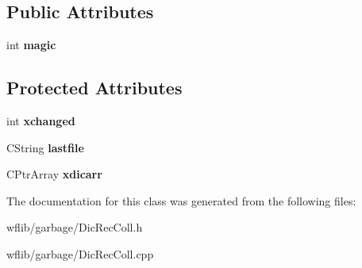 \subsection*{Public Attributes}
\begin{DoxyCompactItemize}
\item 
\hypertarget{class_c_dic_rec_coll_a12f12ef510e8da90ca4b0f6b7d59945f}{int {\bfseries magic}}\label{class_c_dic_rec_coll_a12f12ef510e8da90ca4b0f6b7d59945f}

\end{DoxyCompactItemize}
\subsection*{Protected Attributes}
\begin{DoxyCompactItemize}
\item 
\hypertarget{class_c_dic_rec_coll_a1b295ef62d9b8d3ac5f66213de0d531d}{int {\bfseries xchanged}}\label{class_c_dic_rec_coll_a1b295ef62d9b8d3ac5f66213de0d531d}

\item 
\hypertarget{class_c_dic_rec_coll_ad749c5cc58b0191a9983a9aec6474332}{C\-String {\bfseries lastfile}}\label{class_c_dic_rec_coll_ad749c5cc58b0191a9983a9aec6474332}

\item 
\hypertarget{class_c_dic_rec_coll_a39a58c5be315af3e6e790cd86539d5c0}{C\-Ptr\-Array {\bfseries xdicarr}}\label{class_c_dic_rec_coll_a39a58c5be315af3e6e790cd86539d5c0}

\end{DoxyCompactItemize}


The documentation for this class was generated from the following files\-:\begin{DoxyCompactItemize}
\item 
wflib/garbage/Dic\-Rec\-Coll.\-h\item 
wflib/garbage/Dic\-Rec\-Coll.\-cpp\end{DoxyCompactItemize}
